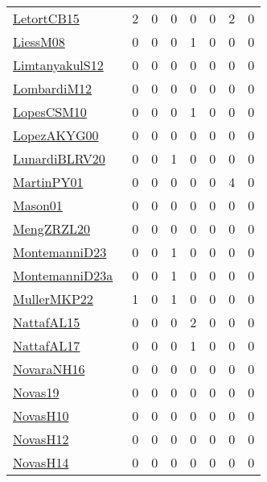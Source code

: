{\begin{longtable}{l*{7}{r}}
\href{articles/LetortCB15.pdf}{LetortCB15}~\cite{LetortCB15} & 2 & 0 & 0 & 0 & 0 & 2 & 0\\
\href{articles/LiessM08.pdf}{LiessM08}~\cite{LiessM08} & 0 & 0 & 0 & 1 & 0 & 0 & 0\\
\href{articles/LimtanyakulS12.pdf}{LimtanyakulS12}~\cite{LimtanyakulS12} & 0 & 0 & 0 & 0 & 0 & 0 & 0\\
\href{articles/LombardiM12.pdf}{LombardiM12}~\cite{LombardiM12} & 0 & 0 & 0 & 0 & 0 & 0 & 0\\
\href{articles/LopesCSM10.pdf}{LopesCSM10}~\cite{LopesCSM10} & 0 & 0 & 0 & 1 & 0 & 0 & 0\\
\href{articles/LopezAKYG00.pdf}{LopezAKYG00}~\cite{LopezAKYG00} & 0 & 0 & 0 & 0 & 0 & 0 & 0\\
\href{articles/LunardiBLRV20.pdf}{LunardiBLRV20}~\cite{LunardiBLRV20} & 0 & 0 & 1 & 0 & 0 & 0 & 0\\
\href{articles/MartinPY01.pdf}{MartinPY01}~\cite{MartinPY01} & 0 & 0 & 0 & 0 & 0 & 4 & 0\\
\href{articles/Mason01.pdf}{Mason01}~\cite{Mason01} & 0 & 0 & 0 & 0 & 0 & 0 & 0\\
\href{articles/MengZRZL20.pdf}{MengZRZL20}~\cite{MengZRZL20} & 0 & 0 & 0 & 0 & 0 & 0 & 0\\
\href{articles/MontemanniD23.pdf}{MontemanniD23}~\cite{MontemanniD23} & 0 & 0 & 1 & 0 & 0 & 0 & 0\\
\href{articles/MontemanniD23a.pdf}{MontemanniD23a}~\cite{MontemanniD23a} & 0 & 0 & 1 & 0 & 0 & 0 & 0\\
\href{articles/MullerMKP22.pdf}{MullerMKP22}~\cite{MullerMKP22} & 1 & 0 & 1 & 0 & 0 & 0 & 0\\
\href{articles/NattafAL15.pdf}{NattafAL15}~\cite{NattafAL15} & 0 & 0 & 0 & 2 & 0 & 0 & 0\\
\href{articles/NattafAL17.pdf}{NattafAL17}~\cite{NattafAL17} & 0 & 0 & 0 & 1 & 0 & 0 & 0\\
\href{articles/NovaraNH16.pdf}{NovaraNH16}~\cite{NovaraNH16} & 0 & 0 & 0 & 0 & 0 & 0 & 0\\
\href{articles/Novas19.pdf}{Novas19}~\cite{Novas19} & 0 & 0 & 0 & 0 & 0 & 0 & 0\\
\href{articles/NovasH10.pdf}{NovasH10}~\cite{NovasH10} & 0 & 0 & 0 & 0 & 0 & 0 & 0\\
\href{articles/NovasH12.pdf}{NovasH12}~\cite{NovasH12} & 0 & 0 & 0 & 0 & 0 & 0 & 0\\
\href{articles/NovasH14.pdf}{NovasH14}~\cite{NovasH14} & 0 & 0 & 0 & 0 & 0 & 0 & 0\\

\end{longtable}}
